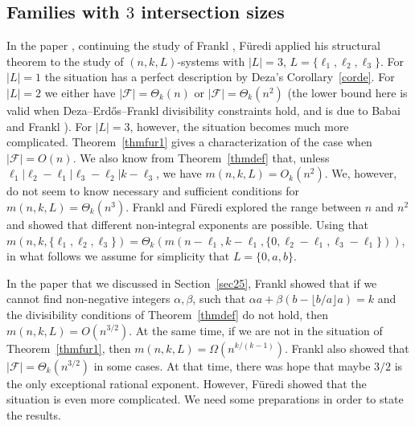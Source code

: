 \documentclass[graybox]{svmult}
\newcommand{\ff}{\mathcal{F}}
\begin{document}
\subsection{Families with $3$ intersection sizes} In the paper \cite{Fur85}, continuing the study of Frankl \cite{Fra83}, F\"uredi applied his structural theorem to the study of $(n,k,L)$-systems with $|L|=3$, $L = \{\ell_1,\ell_2,\ell_3\}$. For $|L|=1$ the situation has a perfect description by Deza's Corollary~\ref{corde}. For $|L|=2$ we either have $|\ff| = \Theta_k(n)$ or $|\ff| = \Theta_k(n^2)$ (the lower bound here is valid when Deza--Erd\H os--Frankl divisibility constraints hold, and is due to Babai and Frankl \cite{BF}). For $|L|=3$, however, the situation becomes much more complicated. Theorem~\ref{thmfur1} gives a characterization of the case when $|\ff| = O(n)$. We also know from Theorem~\ref{thmdef} that, unless $\ell_1|\ell_2-\ell_1|\ell_3-\ell_2|k-\ell_3$, we have  $m(n,k,L) = O_k(n^2)$. We, however, do not seem to know necessary and sufficient conditions for $m(n,k,L) = \Theta_k(n^3)$. Frankl and F\"uredi explored the range between $n$ and $n^2$ and showed that different non-integral exponents are possible.
Using that $m(n,k,\{\ell_1,\ell_2,\ell_3\}) = \Theta_k(m(n-\ell_1,k-\ell_1,\{0,\ell_2-\ell_1,\ell_3-\ell_1\}))$,  in what follows we assume for simplicity that $L = \{0,a,b\}$.

In the paper that we discussed in Section~\ref{sec25}, Frankl \cite{Fra83} showed that if we cannot find non-negative integers $\alpha,\beta$, such that $\alpha a+\beta (b-\lfloor b/a\rfloor a) =k$ and the divisibility conditions of Theorem~\ref{thmdef}  do not hold, then $m(n,k,L) = O(n^{3/2})$. At the same time, if we are not in the situation of Theorem~\ref{thmfur1}, then $m(n,k,L) = \Omega(n^{k/(k-1)})$. Frankl \cite{Fra83} also showed that $|\ff| = \Theta_k(n^{3/2})$ in some cases. At that time, there was hope that maybe $3/2$ is the only exceptional rational exponent. However, F\"uredi showed that the situation is even more complicated. We need some preparations in order to state the results.
\end{document}
